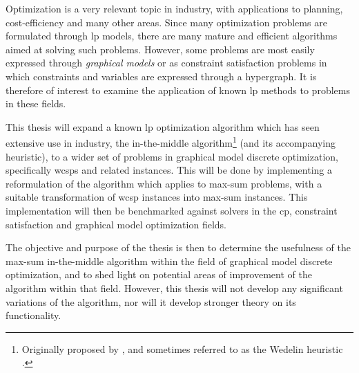 Optimization is a very relevant topic in industry, with applications to planning, cost-efficiency and many other areas.
Since many optimization problems are formulated through \gls{lp} models, there are many mature and efficient algorithms aimed at solving such problems.
However, some problems are most easily expressed through \emph{graphical models} or as constraint satisfaction problems in which constraints and variables are expressed through a hypergraph.
It is therefore of interest to examine the application of known \gls{lp} methods to problems in these fields.

This thesis will expand a known \gls{lp} optimization algorithm which has seen extensive use in industry, the in-the-middle algorithm\footnote{Originally proposed by \textcite{Wedelin95}, and sometimes referred to as the Wedelin heuristic \parencite{Bastert10}.} (and its accompanying heuristic), to a wider set of problems in graphical model discrete optimization, specifically \glspl{wcsp} and related instances.
This will be done by implementing a reformulation of the algorithm \parencite[due to][]{Wedelin08} which applies to max-sum problems, with a suitable transformation of \gls{wcsp} instances into max-sum instances.
This implementation will then be benchmarked against solvers in the \gls{cp}, constraint satisfaction and graphical model optimization fields.

The objective and purpose of the thesis is then to determine the usefulness of the max-sum in-the-middle algorithm within the field of graphical model discrete optimization, and to shed light on potential areas of improvement of the algorithm within that field.
However, this thesis will not develop any significant variations of the algorithm, nor will it develop stronger theory on its functionality.
